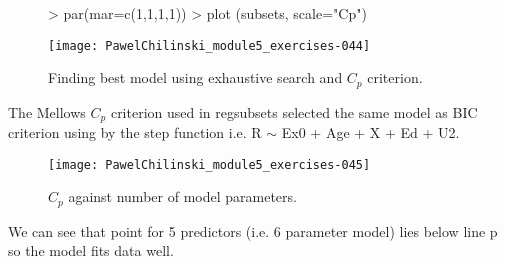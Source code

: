 \documentclass[a4paper]{article}
\begin{document}
\begin{itemize}
\begin{itemize}
\begin{itemize}
\begin{figure}[H]
\begin{center}
\begin{Schunk}
\begin{Sinput}
> par(mar=c(1,1,1,1))
> plot (subsets, scale="Cp")
\end{Sinput}
\end{Schunk}
\texttt{[image: PawelChilinski\_module5\_exercises-044]}
\caption{Finding best model using exhaustive search and $C_p$ criterion.}
\end{center}
\end{figure}
The Mellows $C_p$ criterion used in regsubsets selected the same model as BIC
criterion using by the step function i.e. R $\sim$ Ex0 + Age + X + Ed + U2.
\begin{figure}[H]
\begin{center}
\begin{Schunk}
\end{Schunk}
\texttt{[image: PawelChilinski\_module5\_exercises-045]}
\caption{$C_p$ against number of model parameters.}
\end{center}
\end{figure}
We can see that point for 5 predictors (i.e. 6 parameter model) lies below line
p so the model fits data well.
\end{itemize}
\end{itemize}  
\end{itemize}
\end{document}
